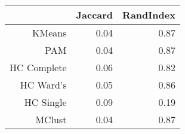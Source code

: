 \begin{table}[ht]
\centering
\begin{tabular}{rrr}
  \hline
 & Jaccard & RandIndex \\ 
  \hline
KMeans & 0.04 & 0.87 \\ 
  PAM & 0.04 & 0.87 \\ 
  HC Complete & 0.06 & 0.82 \\ 
  HC Ward's & 0.05 & 0.86 \\ 
  HC Single & 0.09 & 0.19 \\ 
  MClust & 0.04 & 0.87 \\ 
   \hline
\end{tabular}
\end{table}
